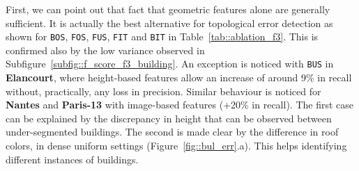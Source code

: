             \begin{figure}[htpb]
                \centering
            \end{figure}

            First, we can point out that fact that geometric features alone are generally sufficient.
            It is actually the best alternative for topological error detection as shown for \texttt{BOS}, \texttt{FOS}, \texttt{FUS}, \texttt{FIT} and \texttt{BIT} in Table~\ref{tab::ablation_f3}.
            This is confirmed also by the low variance observed in Subfigure~\ref{subfig::f_score_f3_building}.
            An exception is noticed with \texttt{BUS} in \textbf{Elancourt}, where height-based features allow an increase of around 9\% in recall without, practically, any loss in precision.
            Similar behaviour is noticed for \textbf{Nantes} and \textbf{Paris-13} with image-based features (+20\% in recall).
            The first case can be explained by the discrepancy in height that can be observed between under-segmented buildings.
            The second is made clear by the difference in roof colors, in dense uniform settings (Figure~\ref{fig::bul_err}.a).
            This helps identifying different instances of buildings.\\

